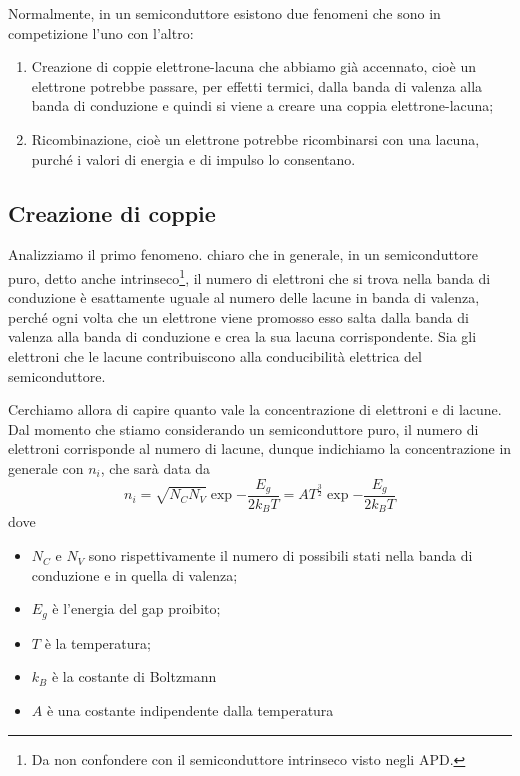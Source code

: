 Normalmente, in un semiconduttore esistono due fenomeni che sono in competizione l'uno con l'altro:

\begin{enumerate}[leftmargin=0.6cm]
   \item Creazione di coppie elettrone-lacuna che abbiamo già accennato, cioè un elettrone potrebbe passare, per effetti termici, dalla banda di valenza alla banda di conduzione e quindi si viene a creare una coppia elettrone-lacuna;
   \item Ricombinazione, cioè un elettrone potrebbe ricombinarsi con una lacuna, purché i valori di energia e di impulso lo consentano.
\end{enumerate}

\subsection{Creazione di coppie}

Analizziamo il primo fenomeno. \E chiaro che in generale, in un semiconduttore puro, detto anche intrinseco\footnote{Da non confondere con il semiconduttore intrinseco visto negli APD.}, il numero di elettroni che si trova nella banda di conduzione è esattamente uguale al numero delle lacune in banda di valenza, perché ogni volta che un elettrone viene promosso esso salta dalla banda di valenza alla banda di conduzione e crea la sua lacuna corrispondente. Sia gli elettroni che le lacune contribuiscono alla conducibilità elettrica del semiconduttore. 

Cerchiamo allora di capire quanto vale la concentrazione di elettroni e di lacune. Dal momento che stiamo considerando un semiconduttore puro, il numero di elettroni corrisponde al numero di lacune, dunque indichiamo la concentrazione in generale con $n_i$, che sarà data da
\begin{equation*}
   n_i
   =\sqrt{N_C N_V} \exp{ -\frac{E_g}{2k_B T} }
   =AT^{\frac{3}{2}} \exp{ -\frac{E_g}{2k_B T} }
\end{equation*}
dove
\begin{itemize}[leftmargin=0.5cm]
   \item $N_C$ e $N_V$ sono rispettivamente il numero di possibili stati nella banda di conduzione e in quella di valenza;
   \item $E_g$ è l'energia del gap proibito;
   \item $T$ è la temperatura;
   \item $k_B$ è la costante di Boltzmann
   \item $A$ è una costante indipendente dalla temperatura
\end{itemize}

